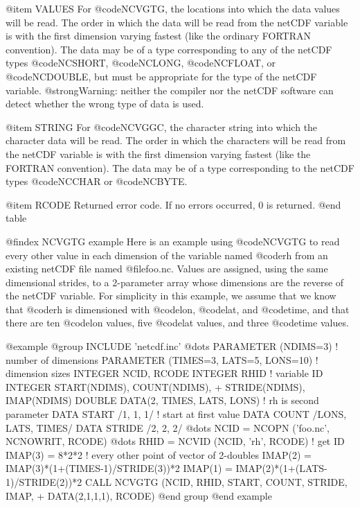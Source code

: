 @item VALUES
For @code{NCVGTG}, the locations into which the data values will be
read.  The order in which the data will be read from the netCDF variable
is with the first dimension varying fastest
(like the ordinary FORTRAN convention).  The data may be of a type
corresponding to any of the netCDF types @code{NCSHORT}, @code{NCLONG},
@code{NCFLOAT}, or @code{NCDOUBLE}, but must be appropriate for the type
of the netCDF variable.  @strong{Warning: neither the compiler nor the
netCDF software can detect whether the wrong type of data is used.}

@item STRING
For @code{NCVGGC}, the character string into which the character data
will be read.  The order in which the characters will be read from the
netCDF variable is with the first dimension
varying fastest (like the FORTRAN convention).  The data may be of a
type corresponding to the netCDF types @code{NCCHAR} or @code{NCBYTE}.

@item RCODE
Returned error code.  If no errors occurred, 0 is returned.
@end table

@findex NCVGTG example
Here is an example using @code{NCVGTG} to read every other value in each
dimension of the variable named @code{rh} from an existing netCDF file
named @file{foo.nc}.  Values are assigned, using the same dimensional
strides, to a 2-parameter array whose dimensions are the reverse of the
netCDF variable.  For simplicity in this example, we assume that we know
that @code{rh} is dimensioned with @code{lon}, @code{lat}, and
@code{time}, and that there are ten @code{lon} values, five @code{lat}
values, and three @code{time} values.

@example
@group
      INCLUDE 'netcdf.inc'
         @dots{}
      PARAMETER (NDIMS=3) ! number of dimensions
      PARAMETER (TIMES=3, LATS=5, LONS=10) ! dimension sizes
      INTEGER NCID, RCODE
      INTEGER RHID ! variable ID
      INTEGER START(NDIMS), COUNT(NDIMS),
     + STRIDE(NDIMS), IMAP(NDIMS)
      DOUBLE DATA(2, TIMES, LATS, LONS) ! rh is second parameter
      DATA START /1, 1, 1/ ! start at first value
      DATA COUNT /LONS, LATS, TIMES/
      DATA STRIDE /2, 2, 2/
         @dots{}
      NCID = NCOPN ('foo.nc', NCNOWRIT, RCODE)
         @dots{}
      RHID = NCVID (NCID, 'rh', RCODE)  ! get ID
      IMAP(3) = 8*2*2 ! every other point of vector of 2-doubles
      IMAP(2) = IMAP(3)*(1+(TIMES-1)/STRIDE(3))*2
      IMAP(1) = IMAP(2)*(1+(LATS-1)/STRIDE(2))*2
      CALL NCVGTG (NCID, RHID, START, COUNT, STRIDE, IMAP,
     + DATA(2,1,1,1), RCODE)
@end group
@end example

